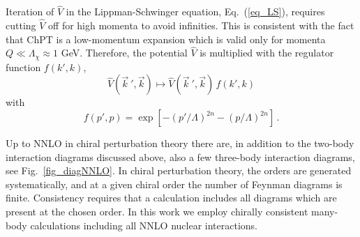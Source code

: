 Iteration of $\widehat V$ in the Lippman-Schwinger equation, Eq.~(\ref{eq_LS}),
requires cutting $\widehat V$ off for high momenta to avoid
infinities.  This is consistent with the fact that ChPT is a
low-momentum expansion which is valid only for momenta $Q \ll
\Lambda_\chi \approx 1$ GeV.  Therefore, the potential $\widehat V$ is
multiplied with the regulator function $f(k',k)$,
\begin{equation}
{\widehat V}(\vec{ k}~',{\vec k}) \longmapsto {\widehat V}(\vec{
  k}~',{\vec k}) \, f(k',k)
\end{equation}
with
\begin{equation}
f(p',p) = \exp[-(p'/\Lambda)^{2n}-(p/\Lambda)^{2n}] \,.
\label{eq:eq_f}
\end{equation}


Up to NNLO in chiral perturbation theory there are, in addition to the
two-body interaction diagrams discussed above, also a few three-body
interaction diagrams, see Fig.~\ref{fig_diagNNLO}. In chiral
perturbation theory, the orders are generated systematically, and at a
given chiral order the number of Feynman diagrams is
finite. Consistency requires that a calculation includes all diagrams
which are present at the chosen order. In this work we employ chirally
consistent many-body calculations including all NNLO nuclear
interactions.

